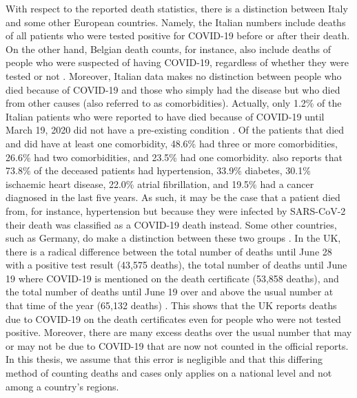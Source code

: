 \documentclass[12pt]{article}
\begin{document}
	With respect to the reported death statistics, there is a distinction between Italy and some other European countries. Namely, the Italian numbers include deaths of all patients who were tested positive for COVID-19 before or after their death. On the other hand, Belgian death counts, for instance, also include deaths of people who were suspected of having COVID-19, regardless of whether they were tested or not \parencite{schultz2020belgiumDeathRate}. Moreover, Italian data makes no distinction between people who died because of COVID-19 and those who simply had the disease but who died from other causes (also referred to as comorbidities). Actually, only 1.2\% of the Italian patients who were reported to have died because of COVID-19 until March 19, 2020 did not have a pre-existing condition \parencite{ecdc2020riskassessment}. Of the patients that died and did have at least one comorbidity, 48.6\% had three or more comorbidities, 26.6\% had two comorbidities, and 23.5\% had one comorbidity. \textcite{ecdc2020riskassessment} also reports that 73.8\% of the deceased patients had hypertension, 33.9\% diabetes, 30.1\% ischaemic heart disease, 22.0\% atrial fibrillation, and 19.5\% had a cancer diagnosed in the last five years. As such, it may be the case that a patient died from, for instance, hypertension but because they were infected by SARS-CoV-2 their death was classified as a COVID-19 death instead. Some other countries, such as Germany, do make a distinction between these two groups  \parencite{otherCountriesDeathsCaccia}. In the UK, there is a radical difference between the total number of deaths until June 28 with a positive test result (43,575 deaths), the total number of deaths until June 19 where COVID-19 is mentioned on the death certificate (53,858 deaths), and the total number of deaths until June 19 over and above the usual number at that time of the year (65,132 deaths) \parencite{bbc2020deathrate}. This shows that the UK reports deaths due to COVID-19 on the death certificates even for people who were not tested positive. Moreover, there are many excess deaths over the usual number that may or may not be due to COVID-19 that are now not counted in the official reports. In this thesis, we assume that this error is negligible and that this differing method of counting deaths and cases only applies on a national level and not among a country's regions. \\
	
\end{document}
